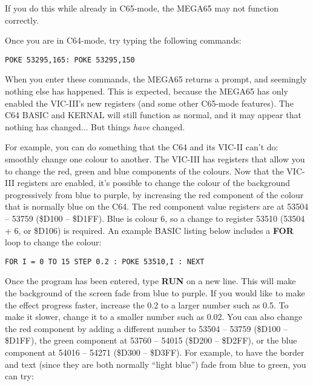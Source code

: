 If you do this while already in C65-mode, the MEGA65 may not function correctly.

Once you are in C64-mode, try typing the following commands:

\begin{tcolorbox}[colback=black,coltext=white]
\verbatimfont{\codefont}
\begin{verbatim}
POKE 53295,165: POKE 53295,150
\end{verbatim}
\end{tcolorbox}

When you enter these commands, the MEGA65 returns a  prompt, and seemingly nothing else has
happened.  This is expected, because the MEGA65 has only enabled the VIC-III's new registers (and some other
C65-mode features). The C64 BASIC and KERNAL will still function as normal, and it may appear
that nothing has changed... But things \textit{have} changed.

For example, you can do something that the C64 and its VIC-II can't do: smoothly change one colour to another.
The VIC-III has registers that allow you to change the red, green and blue components of the colours. Now that the VIC-III
registers are enabled, it's possible to change the colour of the background progressively from blue to purple, by increasing
the red component of the colour that is normally blue on the C64.  The red component value registers are at
53504 -- 53759 (\$D100 -- \$D1FF). Blue is colour 6, so a change to register 53510 (53504 + 6, or \$D106) is required.
An example BASIC listing below includes a {\bf FOR} loop to change the colour:

\begin{tcolorbox}[colback=black,coltext=white]
\verbatimfont{\codefont}
\begin{verbatim}
FOR I = 0 TO 15 STEP 0.2 : POKE 53510,I : NEXT
\end{verbatim}
\end{tcolorbox}

Once the program has been entered, type {\bf RUN} on a new line. This will make the background of the screen fade from
blue to purple.  If you would like to make the effect progress faster, increase the 0.2 to a larger number such as 0.5. To
make it slower, change it to a smaller number such as 0.02. You can also change the red component by adding a
different number to 53504 – 53759 (\$D100 – \$D1FF), the green component at 53760 -- 54015 (\$D200 -- \$D2FF), or the
blue component at 54016 -- 54271 (\$D300 -- \$D3FF).  For example, to have
the border and text (since they are both normally ``light blue'') fade from blue to green, you can try:

